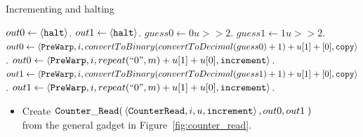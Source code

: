 \begin{itemize}
    \begin{algorithm}
        \caption{Incrementing and halting}\label{asda}
        \begin{algorithmic}[1]
                    \State $out0 \gets \left\langle {\tt halt} \right\rangle$.
                    \State $out1 \gets \left\langle {\tt halt} \right\rangle$.
                \Else
                    \State $guess0 \gets 0u >> 2$.
                    \State $guess1 \gets 1u >> 2$.
                        \State $out0 \gets \left\langle {\tt PreWarp}, i, convertToBinary(convertToDecimal(guess0) + 1) + u[1] + [0], {\tt copy} \right\rangle$.
                    \Else
                        \State $out0 \gets \left\langle {\tt PreWarp}, i, repeat(``0", m) + u[1] + u[0], {\tt increment} \right\rangle$.
                    \EndIf
                        \State $out1 \gets \left\langle {\tt PreWarp}, i, convertToBinary(convertToDecimal(guess1) + 1) + u[1] + [0], {\tt copy} \right\rangle$.
                    \Else
                        \State $out1 \gets \left\langle {\tt PreWarp}, i, repeat(``0", m) + u[1] + u[0], {\tt increment} \right\rangle$.
                    \EndIf
                \EndIf
            \EndFunction
        \end{algorithmic}
    \end{algorithm}

    \begin{itemize}
        \item
        Create $\begin{aligned}[t]
                   {\tt Counter\_Read}(& \left\langle {\tt CounterRead}, i, u, {\tt increment} \right\rangle, out0, out1 \;)
               \end{aligned}$\\from the general gadget in Figure~\ref{fig:counter_read}.
    \end{itemize}
\end{itemize}

